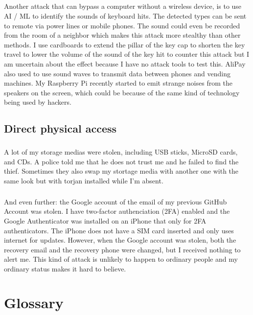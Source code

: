 \documentclass[mscthesis]{usiinfthesis}
\begin{document}
\paragraph{}
Another attack that can bypass a computer without a wireless device, is to use AI / ML to identify the sounds of keyboard hits. The detected types can be sent to remote via power lines or mobile phones. The sound could even be recorded from the room of a neighbor which makes this attack more stealthy than other methods. I use cardboards to extend the pillar of the key cap to shorten the key travel to lower the volume of the sound of the key hit to counter this attack but I am uncertain about the effect because I have no attack tools to test this. AliPay also used to use sound waves to transmit data between phones and vending machines. My Raspberry Pi recently started to emit strange noises from the speakers on the screen, which could be because of the same kind of technology being used by hackers.

\section{Direct physical access}
\paragraph{}
A lot of my storage medias were stolen, including USB sticks, MicroSD cards, and CDs. A police told me that he does not trust me and he failed to find the thief. Sometimes they also swap my stortage media with another one with the same look but with torjan installed while I'm absent.
\paragraph{}
And even further: the Google account of the email of my previous GitHub Account was stolen. I have two-factor authenciation (2FA) enabled and the Google Authenticator was installed on an iPhone that only for 2FA authenticators. The iPhone does not have a SIM card inserted and only uses internet for updates. However, when the Google account was stolen, both the recovery email and the recovery phone were changed, but I received nothing to alert me. This kind of attack is unlikely to happen to ordinary people and my ordinary status makes it hard to believe.

\backmatter

\chapter{Glossary} %
\end{document}
